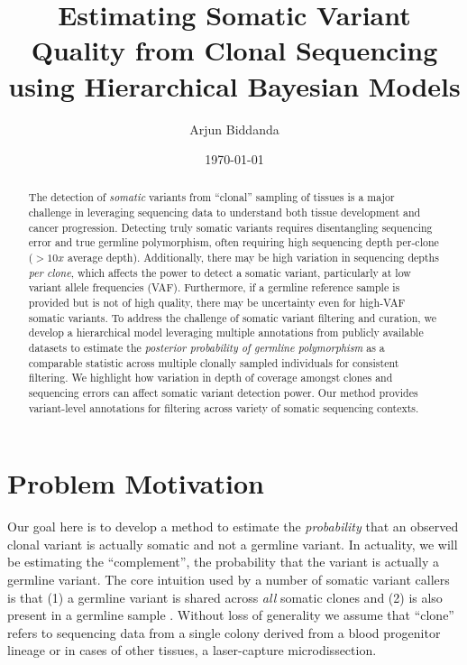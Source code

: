 \documentclass{article}
\title{Estimating Somatic Variant Quality from Clonal Sequencing using Hierarchical Bayesian Models}
\author[1,*]{Arjun Biddanda}
\affil[1]{Johns Hopkins University, Department of Biology}
\affil[*]{Contact: \href{mailto:abiddan1@jhu.edu}{abiddan1@jhu.edu}}
\date{\today}
\begin{document}
\maketitle


\begin{abstract}
The detection of \textit{somatic} variants from ``clonal'' sampling of tissues is a major challenge in leveraging sequencing data to understand both tissue development and cancer progression. Detecting truly somatic variants requires disentangling sequencing error and true germline polymorphism, often requiring high sequencing depth per-clone ($> 10x$ average depth). Additionally, there may be high variation in sequencing depths \textit{per clone}, which affects the power to detect a somatic variant, particularly at low variant allele frequencies (VAF). Furthermore, if a germline reference sample is provided but is not of high quality, there may be uncertainty even for high-VAF somatic variants. To address the challenge of somatic variant filtering and curation, we develop a hierarchical model leveraging multiple annotations from publicly available datasets to estimate the \textit{posterior probability of germline polymorphism} as a comparable statistic across multiple clonally sampled individuals for consistent filtering. We highlight how variation in depth of coverage amongst clones and sequencing errors can affect somatic variant detection power. Our method provides variant-level annotations for filtering across variety of somatic sequencing contexts.
\end{abstract}

\section*{Problem Motivation}

Our goal here is to develop a method to estimate the \textit{probability} that an observed clonal variant is actually somatic and not a germline variant. In actuality, we will be estimating the ``complement'', the probability that the variant is actually a germline variant. The core intuition used by a number of somatic variant callers is that (1) a germline variant is shared across \textit{all} somatic clones and (2) is also present in a germline sample \citep{Coorens2021-xy,Coorens2024-be,Spencer-Chapman2025-pj}. Without loss of generality we assume that ``clone'' refers to sequencing data from a single colony derived from a blood progenitor lineage or in cases of other tissues, a laser-capture microdissection.
\end{document}
